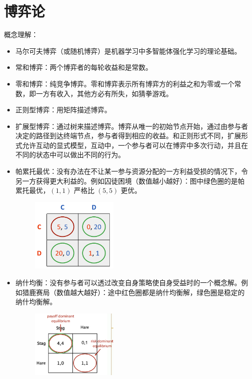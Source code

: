 \section{博弈论}
\begin{remark}
    概念理解：
    \begin{itemize}
        \item 马尔可夫博弈（或随机博弈）是机器学习中多智能体强化学习的理论基础。
        \item 常和博弈：两个博弈者的每轮收益和是常数。
        \item 零和博弈：纯竞争博弈。零和博弈表示所有博弈方的利益之和为零或一个常数，即一方有收入，其他方必有所失，如猜拳游戏。
        \item 正则型博弈：用矩阵描述博弈。
        \item 扩展型博弈：通过树来描述博弈。博弈从唯一的初始节点开始，通过由参与者决定的路径到达终端节点，参与者得到相应的收益。和正则形式不同，扩展形式允许互动的显式模型，互动中，一个参与者可以在博弈中多次行动，并且在不同的状态中可以做出不同的行为。
        \item 帕累托最优：没有办法在不让某一参与资源分配的一方利益受损的情况下，令另一方获得更大利益的。例如囚徒困境（数值越小越好）：图中绿色圈的是帕累托最优，$(1, 1)$ 严格比 $(5, 5)$ 更优。
        \begin{figure}[htbp]
            \centering
            \includegraphics[width=0.4\textwidth]{./figure/fig5.png}
        \end{figure}
        \item 纳什均衡：没有参与者可以透过改变自身策略使自身受益时的一个概念解。例如猎鹿赛局（数值越大越好）：途中红色圈都是纳什均衡解，绿色圈是稳定的纳什均衡解。
        \begin{figure}[htbp]
            \centering
            \includegraphics[width=0.4\textwidth]{./figure/fig6.png}

\end{figure}
\end{itemize}
\end{remark}
